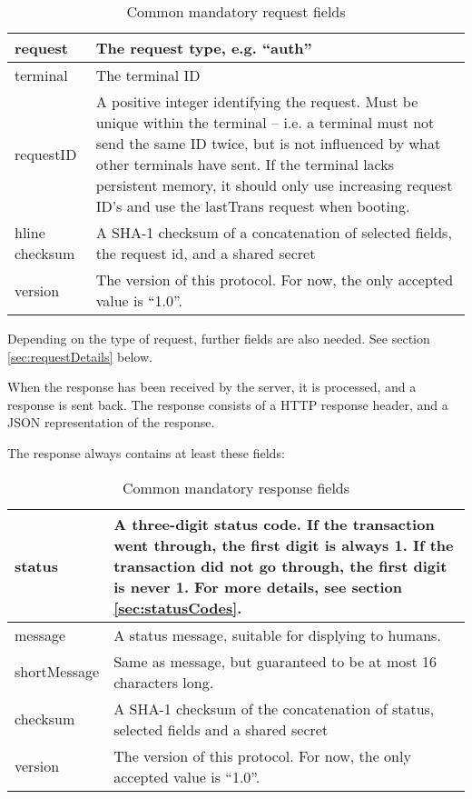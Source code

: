\documentclass[a4paper,11pt]{article}
\newcommand{\code}[1]
   {\textsf{#1}}
\begin{document}
\begin{table}[!h]
  \begin{tabular}{|l|l|}
    \hline
    request & The request type, e.g. ``auth'' \\\hline
    terminal & The terminal ID \\\hline
    requestID & A positive integer identifying the request. Must be unique
      within the terminal -- i.e. a terminal must not send the same ID
      twice, but is not influenced by what other terminals have sent. If
      the terminal lacks persistent memory, it should only use
      increasing request ID's and use the \code{lastTrans} request
      when booting.\\hline 
    checksum & A SHA-1 checksum of a concatenation of selected fields,
      the request id, and a shared secret \\\hline 
    version & The version of this protocol. For now, the only accepted value is ``1.0''. \\\hline
  \end{tabular} 
  \caption{Common mandatory request fields}
\end{table}

Depending on the type of request, further fields are also needed. See
section \ref{sec:requestDetails} below. 


When the response has been received by the server, it is processed,
and a response is sent back. The response consists of a HTTP response
header, and a JSON representation of the response.

The response always contains at least these fields:

\begin{table}[!h]
  \begin{tabular}{|l|l|}
    \hline
    status & A three-digit status code. If the transaction went
       through, the first digit is always 1. If the transaction did not
       go through, the first digit is never 1.
       For more details, see section \ref{sec:statusCodes}.\\\hline
    message & A status message, suitable for displying to humans.\\\hline
    shortMessage & Same as \code{message}, but guaranteed to be at
       most 16 characters long.\\\hline
    checksum & A SHA-1 checksum of the concatenation of status,
      selected fields and a shared secret \\\hline 
    version & The version of this protocol. For now, the only accepted
      value is ``1.0''. \\\hline 
  \end{tabular} 
  \caption{Common mandatory response fields}
\end{table}
\end{document}
